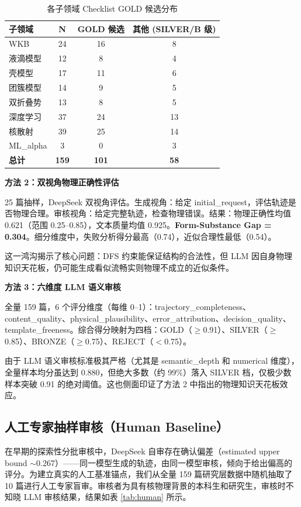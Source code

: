 \documentclass[12pt,a4paper]{article}
\begin{document}
\begin{table}[h]
\centering
\caption{各子领域 Checklist GOLD 候选分布}
\label{tab:audit}
\begin{tabular}{lccc}
\toprule
\textbf{子领域} & \textbf{N} & \textbf{GOLD 候选} & \textbf{其他 (SILVER/B 级)} \\
\midrule
WKB & 24 & 16 & 8 \\
液滴模型 & 12 & 8 & 4 \\
壳模型 & 17 & 11 & 6 \\
团簇模型 & 14 & 9 & 5 \\
双折叠势 & 13 & 8 & 5 \\
深度学习 & 37 & 24 & 13 \\
核散射 & 39 & 25 & 14 \\
ML\_alpha & 3 & 0 & 3 \\
\midrule
\textbf{总计} & \textbf{159} & \textbf{101} & \textbf{58} \\
\bottomrule
\end{tabular}
\end{table}

\textbf{方法 2：双视角物理正确性评估}

25 篇抽样，DeepSeek 双视角评估。生成视角：给定 initial\_request，评估轨迹是否物理合理。审核视角：给定完整轨迹，检查物理错误。结果：物理正确性均值 0.621（范围 0.25--0.85），文本质量均值 0.925。\textbf{Form-Substance Gap = 0.304}。细分维度中，失败分析得分最高（0.74），近似合理性最低（0.54）。

这一鸿沟揭示了核心问题：DFS 约束能保证结构的合法性，但 LLM 因自身物理知识天花板，仍可能生成看似流畅实则物理不成立的近似条件。

\textbf{方法 3：六维度 LLM 语义审核}

全量 159 篇，6 个评分维度（每维 0--1）：trajectory\_completeness、content\_quality、physical\_plausibility、error\_attribution、decision\_quality、template\_freeness。综合得分映射为四档：GOLD（$\geq$0.91）、SILVER（$\geq$0.85）、BRONZE（$\geq$0.75）、REJECT（$<$0.75）。

由于 LLM 语义审核标准极其严格（尤其是 semantic\_depth 和 numerical 维度），全量样本均分虽达到 0.880，但绝大多数（约 99\%）落入 SILVER 档，仅极少数样本突破 0.91 的绝对阈值。这也侧面印证了方法 2 中指出的物理知识天花板效应。

\subsection{人工专家抽样审核（Human Baseline）}

在早期的探索性分批审核中，DeepSeek 自审存在确认偏差（estimated upper bound $\sim$0.267）——同一模型生成的轨迹，由同一模型审核，倾向于给出偏高的评分。为建立真实的人工基准锚点，我们从全量 159 篇研究层数据中随机抽取了 10 篇进行人工专家盲审。审核者为具有核物理背景的本科生和研究生，审核时不知晓 LLM 审核结果，结果如表 \ref{tab:human} 所示。
\end{document}
